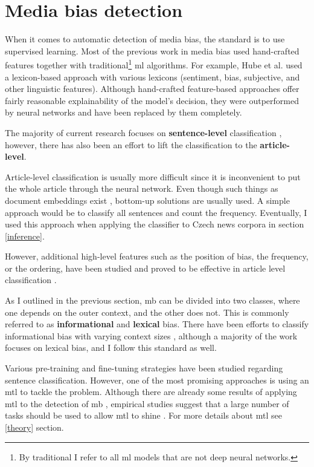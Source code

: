 \section{Media bias detection}\label{mediabias}
When it comes to automatic detection of media bias, the standard is to use supervised learning. Most of the previous work in media bias used hand-crafted features together with traditional\footnote{By traditional I refer to all \Gls{ml} models that are not deep neural networks.} \Gls{ml} algorithms. For example, Hube et al. \cite{hube2018detecting} used a lexicon-based approach with various lexicons (sentiment, bias, subjective, and other linguistic features). Although hand-crafted feature-based approaches offer fairly reasonable explainability of the model's decision, they were outperformed by neural networks and have been replaced by them completely.

The majority of current research focuses on \textbf{sentence-level} classification \cite{sinha2021determining,Spinde2021MBIC,lee2021unifying,hube2019neural}, however, there has also been an effort to lift the classification to the \textbf{article-level}.

Article-level classification is usually more difficult since it is inconvenient to put the whole article through the neural network. Even though such things as document embeddings exist \cite{lau2016empirical}, bottom-up solutions are usually used. A simple approach would be to classify all sentences and count the frequency. Eventually, I used this approach when applying the classifier to Czech news corpora in section \ref{inference}.

However, additional high-level features such as the position of bias, the frequency, or the ordering, have been studied and proved to be effective in article level classification \cite{chen2020detecting,chen-etal-2020-analyzing}.

As I outlined in the previous section, \gls{mb} can be divided into two classes, where one depends on the outer context, and the other does not. This is commonly referred to as \textbf{informational} and \textbf{lexical} bias. There have been efforts to classify informational bias with varying context sizes \cite{van2020context}, although a majority of the work focuses on lexical bias, and I follow this standard as well.

Various pre-training and fine-tuning strategies have been studied regarding sentence classification. However, one of the most promising approaches is using an \Gls{mtl} to tackle the problem. Although there are already some results of applying \Gls{mtl} to the detection of \gls{mb} \cite{lee2021unifying,spindeexploiting}, empirical studies suggest that a large number of tasks should be used to allow \Gls{mtl} to shine \cite{aribandi2021ext5}. For more details about \gls{mtl} see \ref{theory} section.

\let\cleardoublepage\clearpage